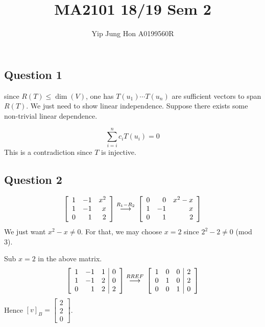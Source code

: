 \documentclass{article}
\title{MA2101 18/19 Sem 2}
\author{Yip Jung Hon A0199560R}
\newcommand{\grstep}[2][\relax]{%
   \ensuremath{\mathrel{
       {\mathop{\longrightarrow}\limits^{#2\mathstrut}_{
                                     \begin{subarray}{l} #1 \end{subarray}}}}}}
\begin{document}
\maketitle
\subsection*{Question 1}
since $R(T) \leq \dim(V)$, one has $T(u_1) \cdots T(u_n)$ are sufficient vectors to span $R(T)$. We just need to show linear independence. Suppose there exists some non-trivial linear dependence.

\begin{equation*}
    \sum_{i=i}^n c_i T(u_i) = 0
\end{equation*}
This is a contradiction since $T$ is injective.

\subsection*{Question 2}
\begin{align*}
  \left[\begin{array}{rrr}
1 & -1 & x^2 \\
1 & -1 & x \\
0 & 1 & 2
\end{array}\right] \grstep{R_1-R_2}{}  \left[\begin{array}{rrr}
0 & 0 & x^2-x \\
1 & -1 & x \\
0 & 1 & 2
\end{array}\right]
\end{align*}
We just want $x^2-x \neq 0$. For that, we may choose $x=2$ since $2^2-2 \neq 0$ (mod 3). 

Sub $x=2$ in the above matrix.
\begin{align*}
    \left[\begin{array}{rrr|r}
1 & -1 & 1 & 0\\
1 & -1 & 2 & 0\\
0 & 1 & 2 & 2 
\end{array}\right] \grstep{RREF}{} \left[\begin{array}{rrr|r}
1 & 0 & 0 & 2\\
0 & 1 & 0 & 2\\
0 & 0 & 1 & 0 
\end{array}\right]
\end{align*}
Hence $[v]_B=\left[\begin{array}{r}
2 \\
2 \\
0  
\end{array}\right] $.
\end{document}
